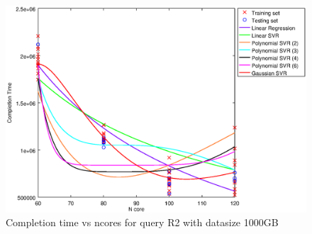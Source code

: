 
\begin {figure}[hbtp]
\centering
\includegraphics[width=\textwidth]{output/R2_1000_ONLY_1_OVER_NCORES/plot_R2_1000.eps}
\caption{Completion time vs ncores for query R2 with datasize 1000GB}
\label{fig:all_nonlinear_R2_1000}
\end {figure}
